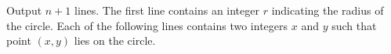 Output $n+1$ lines. 
The first line contains an integer $r$ indicating the radius of the circle. 
Each of the following lines contains two integers $x$ and $y$ 
such that point $(x,y)$ lies on the circle.
